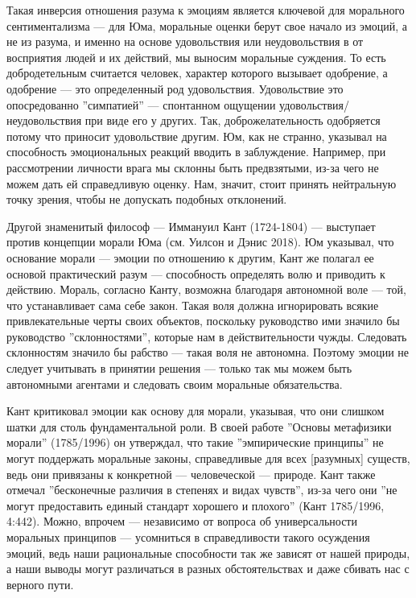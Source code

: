 \documentclass[11pt]{book}
\begin{document}
Такая инверсия отношения разума к эмоциям является ключевой для морального сентиментализма --- для Юма, моральные оценки берут свое начало из эмоций, а не из разума, и именно на основе удовольствия или неудовольствия в от восприятия людей и их действий, мы выносим моральные суждения. То есть добродетельным считается человек, характер которого вызывает одобрение, а одобрение --- это определенный род удовольствия. Удовольствие это опосредованно ''симпатией'' --- спонтанном ощущении удовольствия/неудовольствия при виде его у других. Так, доброжелательность одобряется потому что приносит удовольствие другим. Юм, как не странно, указывал на способность эмоциональных реакций вводить в заблуждение. Например, при рассмотрении личности врага мы склонны быть предвзятыми, из-за чего не можем дать ей справедливую оценку. Нам, значит, стоит принять нейтральную точку зрения, чтобы не допускать подобных отклонений.

Другой знаменитый философ --- Иммануил Кант (1724-1804) --- выступает против концепции морали Юма (см. Уилсон и Дэнис 2018). Юм указывал, что основание морали --- эмоции по отношению к другим, Кант же полагал ее основой практический разум --- способность определять волю и приводить к действию. Мораль, согласно Канту, возможна благодаря автономной воле --- той, что устанавливает сама себе закон. Такая воля должна игнорировать всякие привлекательные черты своих объектов, поскольку руководство ими значило бы руководство ''склонностями'', которые нам в действительности чужды. Следовать склонностям значило бы рабство --- такая воля не автономна. Поэтому эмоции не следует учитывать в принятии решения --- только так мы можем быть автономными агентами и следовать своим моральные обязательства.

Кант критиковал эмоции как основу для морали, указывая, что они слишком шатки для столь фундаментальной роли. В своей работе ''Основы метафизики морали'' (1785/1996) он утверждал, что такие ''эмпирические принципы'' не могут поддержать моральные законы, справедливые для всех [разумных] существ, ведь они привязаны к конкретной --- человеческой --- природе. Кант также отмечал ''бесконечные различия в степенях и видах чувств'', из-за чего они ''не могут предоставить единый стандарт хорошего и плохого'' (Кант 1785/1996, 4:442). Можно, впрочем --- независимо от вопроса об универсальности моральных принципов --- усомниться в справедливости такого осуждения эмоций, ведь наши рациональные способности так же зависят от нашей природы, а наши выводы могут различаться в разных обстоятельствах и даже сбивать нас с верного пути.
\end{document}
